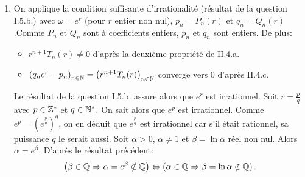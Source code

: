 \begin{enumerate}
\begin{enumerate}
 \end{enumerate}

 \item On applique la condition suffisante d'irrationalité (résultat de la question I.5.b.) avec $\omega = e^r$ (pour $r$ entier non nul), $p_n = P_n(r)$ et $q_n = Q_n(r)$.\newline Comme $P_n$ et $Q_n$ sont à coefficients entiers, $p_n$ et $q_n$ sont entiers.
 De plus:
\vspace{0.2cm}
 \begin{itemize}
  \item $r^{n+1}T_n(r) \neq 0$ d'après la deuxième propriété de II.4.a.
  \item $\left( q_ne^{r} -p_n \right)_{n \in \mathbb{N}}= \left( r^{n+1}T_n(r) \right)_{n \in \mathbb{N}}$ converge vers $0$ d'après II.4.c.
 \end{itemize}
\vspace{0.2cm}
Le résultat de la question I.5.b. assure alors que $e^r$ est irrationnel.\newline
Soit $r=\frac{p}{q}$ avec $p\in \mathbb{Z}^*$ et $q\in \mathbb{N}^*$. On sait alors que $e^{p}$ est irrationnel.\newline
Comme $e^{p} = \left( e^{\frac{p}{q}}\right)^{q}$, on en déduit que $e^{\frac{p}{q}}$ est irrationnel car s'il était rationnel, sa puissance $q$ le serait aussi.\newline
Soit $\alpha >0$, $\alpha \neq 1$ et $\beta = \ln \alpha$ réel non nul. Alors $\alpha = e^\beta$. D'après le résultat précédent:
\[
 \left( \beta \in \mathbb{Q} \Rightarrow \alpha = e^\beta \notin \mathbb{Q}\right) 
 \Leftrightarrow
 \left( \alpha  \in \mathbb{Q} \Rightarrow \beta = \ln \alpha \notin \mathbb{Q}\right).
\]

\end{enumerate}
